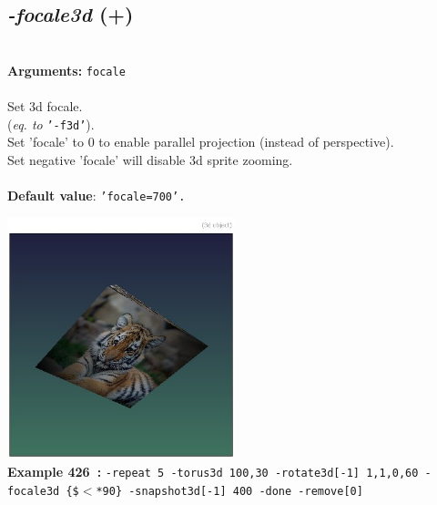 \documentclass[a4paper,11pt,twoside]{book}
\begin{document}
\subsection{\emph{-focale3d} (+)}\vspace*{-0.5em}
~\\\textbf{Arguments: } 
{\small \texttt{focale}}\\~\\
Set 3d focale.
~\\(\emph{eq. to} {\small \texttt{'-f3d'}}).
~\\Set 'focale' to 0 to enable parallel projection (instead of perspective).
~\\Set negative 'focale' will disable 3d sprite zooming.
~\\~\\\textbf{Default value}: {\small \texttt{'focale=700'.}}
\begin{center}\includegraphics[keepaspectratio=true,height=7cm,width=\textwidth]{img/gmic_def426.jpg}\\
{\footnotesize \textbf{Example 426~:} \texttt{-repeat 5 -torus3d 100,30 -rotate3d[-1] 1,1,0,60 -focale3d \{\$$<$*90\} -snapshot3d[-1] 400 -done -remove[0]}}
\end{center}
\end{document}
